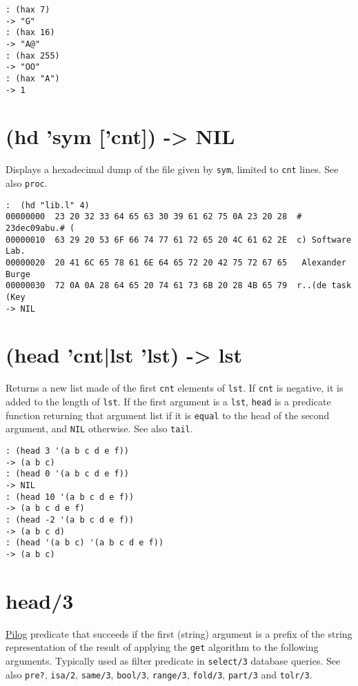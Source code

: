 {{{{{{\begin{verbatim}
: (hax 7)
-> "G"
: (hax 16)
-> "A@"
: (hax 255)
-> "OO"
: (hax "A")
-> 1
\end{verbatim}

 
\section{(hd 'sym ['cnt]) -> NIL}
\label{sec-8-1-8-5}


Displays a hexadecimal dump of the file given by \texttt{sym}, limited to \texttt{cnt}
lines. See also \texttt{proc}.


\begin{verbatim}
:  (hd "lib.l" 4)
00000000  23 20 32 33 64 65 63 30 39 61 62 75 0A 23 20 28  # 23dec09abu.# (
00000010  63 29 20 53 6F 66 74 77 61 72 65 20 4C 61 62 2E  c) Software Lab.
00000020  20 41 6C 65 78 61 6E 64 65 72 20 42 75 72 67 65   Alexander Burge
00000030  72 0A 0A 28 64 65 20 74 61 73 6B 20 28 4B 65 79  r..(de task (Key
-> NIL
\end{verbatim}

 
\section{(head 'cnt|lst 'lst) -> lst}
\label{sec-8-1-8-6}


Returns a new list made of the first \texttt{cnt} elements of \texttt{lst}. If \texttt{cnt}
is negative, it is added to the length of \texttt{lst}. If the first argument
is a \texttt{lst}, \texttt{head} is a predicate function returning that argument list
if it is \texttt{equal} to the head of the second argument, and \texttt{NIL}
otherwise. See also \texttt{tail}.


\begin{verbatim}
: (head 3 '(a b c d e f))
-> (a b c)
: (head 0 '(a b c d e f))
-> NIL
: (head 10 '(a b c d e f))
-> (a b c d e f)
: (head -2 '(a b c d e f))
-> (a b c d)
: (head '(a b c) '(a b c d e f))
-> (a b c)
\end{verbatim}

 
\section{head/3}
\label{sec-8-1-8-7}


\hyperref[ref.html-pilog]{Pilog} predicate that succeeds if the first (string)
argument is a prefix of the string representation of the result of
applying the \texttt{get} algorithm to the following arguments. Typically used
as filter predicate in \texttt{select/3} database queries. See also \texttt{pre?},
\texttt{isa/2}, \texttt{same/3}, \texttt{bool/3}, \texttt{range/3}, \texttt{fold/3}, \texttt{part/3} and \texttt{tolr/3}.


}}}}}}
